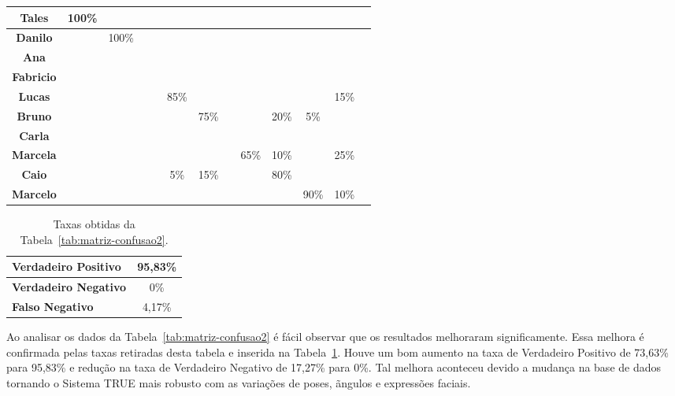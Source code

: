 \begin{table}[htb]
\begin{center}
\begin{tabular}{|c|c|c|c|c|c|c|c|c|c|c|c|c|}
				\hline \bf Tales 			&100\% & 			& 		 & 			&   	 & 			& 	& 		&	 		& 		& 		\\
				\hline \bf Danilo 		& 		 &100\%	& 		 & 			&   	 & 			& 	& 		& 		& 		& 		 		\\
				\hline \bf Ana 				& 		 & 			& 		 & 			&   	 & 			& 	& 		& 		& 		& 		    \\
				\hline \bf Fabricio 	& 		 & 			& 		 &			&      & 			& 	& 		& 		& 		&      		\\
				\hline \bf Lucas 			& 		 & 			& 		 & 			& 85\% & 			& 	& 		& 		& 		& 15\%		\\
				\hline \bf Bruno 			& 		 & 			& 		 & 			& 		 & 75\% & 	& 		&20\% & 5\%	& 		  	\\
				\hline \bf Carla 			& 		 & 			& 		 & 			& 		 & 			& 	&		  & 	  & 		& 		  	\\
				\hline \bf Marcela 		& 		 & 			& 		 & 			& 		 &      & 	&65\% &10\% & 		& 25\%		  	\\
				\hline \bf Caio 		  & 		 & 			& 		 & 			& 	5\%& 	15\%& 	& 		&80\%	&	 		& 		  	\\
				\hline \bf Marcelo 		& 		 & 			& 		 & 			& 		 & 			& 	& 		& 		& 90\%& 10\%		  	\\
				\hline
			\end{tabular}
		\end{center}
	\end{table}

	\begin{table}[htb]
		\begin{center}
			\caption{Taxas obtidas da Tabela~\ref{tab:matriz-confusao2}.}
			\label{tab:taxas2}
			\begin{tabular}{|l|c|}
				\hline \bf Verdadeiro Positivo & 95,83\% \\
				\hline \bf Verdadeiro Negativo & 0\% \\
				\hline \bf Falso Negativo & 4,17\% \\
				\hline
			\end{tabular}
		\end{center}
	\end{table}

	Ao analisar os dados da Tabela~\ref{tab:matriz-confusao2} é fácil observar que os resultados melhoraram significamente. Essa melhora é confirmada pelas taxas retiradas desta tabela e inserida na Tabela~\ref{tab:taxas2}. Houve um bom aumento na taxa de Verdadeiro Positivo de 73,63\% para 95,83\% e redução na taxa de Verdadeiro Negativo de 17,27\% para 0\%. Tal melhora aconteceu devido a mudança na base de dados tornando o Sistema TRUE mais robusto com as variações de poses, ãngulos e expressões faciais.


